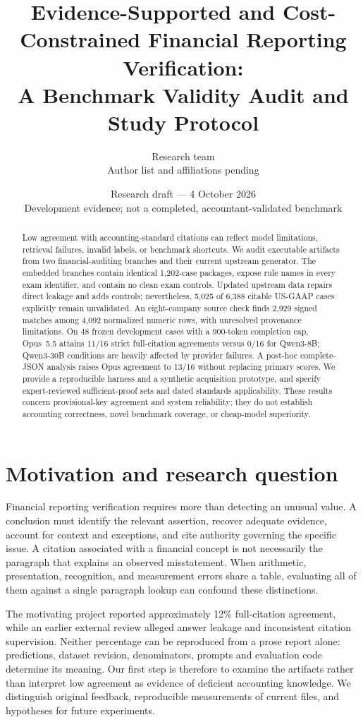 \documentclass[11pt]{article}
\title{Evidence-Supported and Cost-Constrained Financial Reporting Verification:\\A Benchmark Validity Audit and Study Protocol}
\author{Research team\\\small Author list and affiliations pending}
\date{Research draft --- 4 October 2026\\\small Development evidence; not a completed, accountant-validated benchmark}
\begin{document}
\maketitle
\begin{abstract}
Low agreement with accounting-standard citations can reflect model limitations, retrieval failures, invalid labels, or benchmark shortcuts. We audit executable artifacts from two financial-auditing branches and their current upstream generator. The embedded branches contain identical 1,202-case packages, expose rule names in every exam identifier, and contain no clean exam controls. Updated upstream data repairs direct leakage and adds controls; nevertheless, 5,025 of 6,388 citable US-GAAP cases explicitly remain unvalidated. An eight-company source check finds 2,929 signed matches among 4,092 normalized numeric rows, with unresolved provenance limitations. On 48 frozen development cases with a 900-token completion cap, Opus~5.5 attains 11/16 strict full-citation agreements versus 0/16 for Qwen3-8B; Qwen3-30B conditions are heavily affected by provider failures. A post-hoc complete-JSON analysis raises Opus agreement to 13/16 without replacing primary scores. We provide a reproducible harness and a synthetic acquisition prototype, and specify expert-reviewed sufficient-proof sets and dated standards applicability. These results concern provisional-key agreement and system reliability; they do not establish accounting correctness, novel benchmark coverage, or cheap-model superiority.
\end{abstract}

\section{Motivation and research question}
Financial reporting verification requires more than detecting an unusual value. A conclusion must identify the relevant assertion, recover adequate evidence, account for context and exceptions, and cite authority governing the specific issue. A citation associated with a financial concept is not necessarily the paragraph that explains an observed misstatement. When arithmetic, presentation, recognition, and measurement errors share a table, evaluating all of them against a single paragraph lookup can confound these distinctions.

The motivating project reported approximately 12\% full-citation agreement, while an earlier external review alleged answer leakage and inconsistent citation supervision. Neither percentage can be reproduced from a prose report alone: predictions, dataset revision, denominators, prompts and evaluation code determine its meaning. Our first step is therefore to examine the artifacts rather than interpret low agreement as evidence of deficient accounting knowledge. We distinguish original feedback, reproducible measurements of current files, and hypotheses for future experiments.
\end{document}
